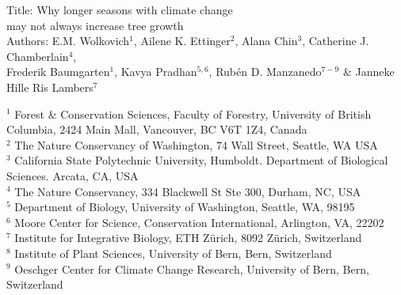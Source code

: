 \documentclass[11pt]{article}
\begin{document}
\renewcommand{\refname}{\CHead{}}


\begin{center}
{\sc Title:} {\Large Why longer seasons with climate change \\ may not always increase tree growth} \\
\vspace{5ex}
{\sc Authors:} E.M. Wolkovich$^1$, Ailene K. Ettinger$^2$, Alana Chin$^3$, Catherine J. Chamberlain$^4$,\\ Frederik Baumgarten$^1$, Kavya Pradhan$^{5,6}$, Rub{\'e}n D. Manzanedo$^{7-9}$ \&  Janneke Hille Ris Lambers$^7$
\end{center}

$^1$ Forest \& Conservation Sciences, Faculty of Forestry, University of British Columbia, 2424 Main Mall, Vancouver, BC V6T 1Z4, Canada\\
$^2$ The Nature Conservancy of Washington, 74 Wall Street, Seattle, WA  USA \\
$^3$ California State Polytechnic University, Humboldt. Department of Biological Sciences. Arcata, CA, USA \\
$^4$ The Nature Conservancy, 334 Blackwell St Ste 300, Durham, NC, USA \\ 
$^5$ Department of Biology, University of Washington, Seattle, WA, 98195 \\
$^6$ Moore Center for Science, Conservation International, Arlington, VA, 22202 \\ %
$^7$ Institute for Integrative Biology, ETH Z{\"u}rich, 8092 Z{\"u}rich, Switzerland \\ %
$^8$ Institute of Plant Sciences, University of Bern, Bern, Switzerland \\
$^9$ Oeschger Center for Climate Change Research, University of Bern, Bern, Switzerland \\




\newpage
\end{document}
